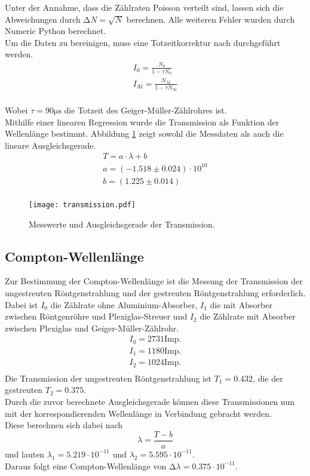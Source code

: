 \noindent Unter der Annahme, dass die Zählraten Poisson verteilt sind,
lassen sich die Abweichungen durch $\increment N = \sqrt{N}$ berechnen.
Alle weiteren Fehler wurden durch Numeric Python berechnet.\\
Um die Daten zu bereinigen, muss eine Totzeitkorrektur nach %
durchgeführt werden. 
\begin{align*}
    I_0 = \frac{N_0}{1 - \tau N_0}\\
    I_\text{Al} = \frac{N_\text{Al}}{1 - \tau N_\text{Al}}\\
\end{align*}

Wobei $\tau = 90 \si{\micro\s}$ die Totzeit des Geiger-Müller-Zählrohres 
ist.\\
Mithilfe einer linearen Regression wurde die Transmission als Funktion 
der Wellenlänge bestimmt. Abbildung \ref{fig:transmission} zeigt sowohl
die Messdaten als auch die lineare Ausgleichsgerade.
\begin{align*}
    T = a \cdot \lambda + b \\
    a = \left( - 1.518 \pm 0.024 \right) \cdot 10^{10} \\
    b = \left( 1.225 \pm 0.014 \right)\\
\end{align*}

\begin{figure}
    \centering
    \texttt{[image: transmission.pdf]}
    \caption{Messwerte und Ausgleichsgerade der Transmission.}
    \label{fig:transmission}
\end{figure}

\subsection{Compton-Wellenlänge}

Zur Bestimmung der Compton-Wellenlänge ist die Messung der Transmission
der ungestreuten Röntgenstrahlung und der gestreuten Röntgenstrahlung erforderlich.
Dabei ist $I_0$ die Zählrate ohne Aluminium-Absorber, $I_1$ die mit Absorber
zwischen Röntgenröhre und Plexiglas-Streuer und $I_2$ die Zählrate mit 
Absorber zwischen Plexiglas und Geiger-Müller-Zählrohr. \\
\begin{align*}
    I_0 = 2731 \text{Imp.}\\
    I_1 = 1180 \text{Imp.}\\
    I_2 = 1024 \text{Imp.}\\
\end{align*}
Die Transmission der ungestreuten Röntgenstrahlung ist $T_1 = 0.432$,
die der gestreuten $T_2 = 0.375$.\\
Durch die zuvor berechnete Ausgleichsgerade können diese Transmissionen nun
mit der korrespondierenden Wellenlänge in Verbindung gebracht werden.\\
Diese berechnen sich dabei nach
\begin{equation}
    \lambda = \frac{T - b}{a}
\end{equation}
und lauten $\lambda_1 = 5.219 \cdot 10^{-11}$ und $\lambda_2 = 5.595 \cdot 10^{-11}$.\\
Daraus folgt eine Compton-Wellenlänge von $\increment \lambda = 0.375 \cdot 10^{-11}$.